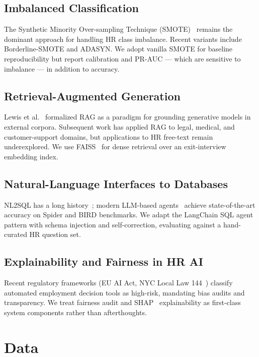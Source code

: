 \documentclass[conference]{IEEEtran}
\begin{document}
\subsection{Imbalanced Classification}
The Synthetic Minority Over-sampling Technique
(SMOTE)~\cite{chawla2002} remains the dominant approach for handling
HR class imbalance. Recent variants include Borderline-SMOTE and
ADASYN. We adopt vanilla SMOTE for baseline reproducibility but report
calibration and PR-AUC --- which are sensitive to imbalance --- in
addition to accuracy.

\subsection{Retrieval-Augmented Generation}
Lewis et al.~\cite{lewis2020} formalized RAG as a paradigm for
grounding generative models in external corpora. Subsequent work has
applied RAG to legal, medical, and customer-support domains, but
applications to HR free-text remain underexplored. We use
FAISS~\cite{johnson2019} for dense retrieval over an exit-interview
embedding index.

\subsection{Natural-Language Interfaces to Databases}
NL2SQL has a long history~\cite{androutsopoulos1995}; modern
LLM-based agents~\cite{rajkumar2022, pourreza2023} achieve
state-of-the-art accuracy on Spider and BIRD benchmarks. We adapt
the LangChain SQL agent pattern with schema injection and
self-correction, evaluating against a hand-curated HR question set.

\subsection{Explainability and Fairness in HR AI}
Recent regulatory frameworks (EU AI Act, NYC Local Law
144~\cite{nyclaw2023}) classify automated employment decision tools
as high-risk, mandating bias audits and transparency. We treat
fairness audit and SHAP~\cite{lundberg2017} explainability as
first-class system components rather than afterthoughts.

\section{Data}
\end{document}
